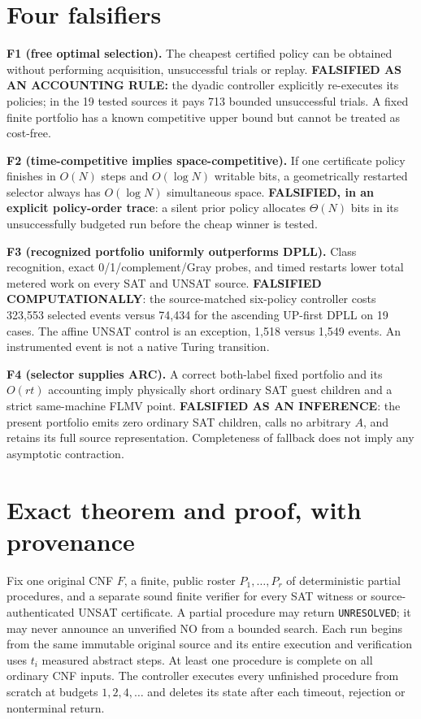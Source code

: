 \documentclass[11pt]{article}
\begin{document}
\section{Four falsifiers}
\noindent\textbf{F1 (free optimal selection).} The cheapest certified policy can be obtained without performing acquisition, unsuccessful trials or replay. \textbf{FALSIFIED AS AN ACCOUNTING RULE:} the dyadic controller explicitly re-executes its policies; in the 19 tested sources it pays 713 bounded unsuccessful trials. A fixed finite portfolio has a known competitive upper bound but cannot be treated as cost-free.

\noindent\textbf{F2 (time-competitive implies space-competitive).} If one certificate policy finishes in $O(N)$ steps and $O(\log N)$ writable bits, a geometrically restarted selector always has $O(\log N)$ simultaneous space. \textbf{FALSIFIED, in an explicit policy-order trace}: a silent prior policy allocates $\Theta(N)$ bits in its unsuccessfully budgeted run before the cheap winner is tested.

\noindent\textbf{F3 (recognized portfolio uniformly outperforms DPLL).} Class recognition, exact 0/1/complement/Gray probes, and timed restarts lower total metered work on every SAT and UNSAT source. \textbf{FALSIFIED COMPUTATIONALLY}: the source-matched six-policy controller costs 323,553 selected events versus 74,434 for the ascending UP-first DPLL on 19 cases. The affine UNSAT control is an exception, 1,518 versus 1,549 events. An instrumented event is not a native Turing transition.

\noindent\textbf{F4 (selector supplies ARC).} A correct both-label fixed portfolio and its $O(rt)$ accounting imply physically short ordinary SAT guest children and a strict same-machine FLMV point. \textbf{FALSIFIED AS AN INFERENCE}: the present portfolio emits zero ordinary SAT children, calls no arbitrary $A$, and retains its full source representation. Completeness of fallback does not imply any asymptotic contraction.

\section{Exact theorem and proof, with provenance}
Fix one original CNF $F$, a finite, public roster $P_1,\ldots,P_r$ of deterministic partial procedures, and a separate sound finite verifier for every SAT witness or source-authenticated UNSAT certificate. A partial procedure may return \texttt{UNRESOLVED}; it may never announce an unverified NO from a bounded search. Each run begins from the same immutable original source and its entire execution and verification uses $t_i$ measured abstract steps. At least one procedure is complete on all ordinary CNF inputs. The controller executes every unfinished procedure from scratch at budgets $1,2,4,\ldots$ and deletes its state after each timeout, rejection or nonterminal return.
\end{document}
